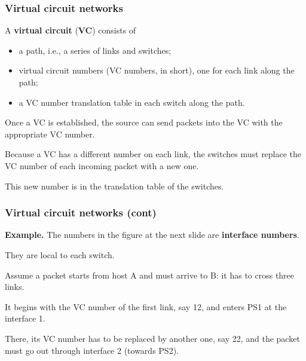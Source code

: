 %
\begin{frame}
\frametitle{Virtual circuit networks}

A \textbf{virtual circuit} (\textbf{VC}) consists of
\begin{itemize}

  \item a path, i.e., a series of links and switches;

  \item virtual circuit numbers (VC numbers, in short), one for each
  link along the path;

  \item a VC number translation table in each switch along the path.

\end{itemize}
Once a VC is established, the source can send packets into the VC with
the appropriate VC number.

\bigskip

Because a VC has a different number on each link, the switches must
replace the VC number of each incoming packet with a new one.

\bigskip

This new number is in the translation table of the switches.

\end{frame}

%
\begin{frame}
\frametitle{Virtual circuit networks (cont)}

\textbf{Example.} The numbers in the figure at the next slide are
\textbf{interface numbers}.

\bigskip

They are local to each switch.

\bigskip

Assume a packet starts from host A and must arrive to B: it has to
cross three links.

\bigskip

It begins with the VC number of the first link, say
12, and enters PS1 at the interface 1.

\bigskip

There, its VC number has to be replaced by another one, say 22, and
the packet must go out through interface 2 (towards PS2).

\end{frame}


